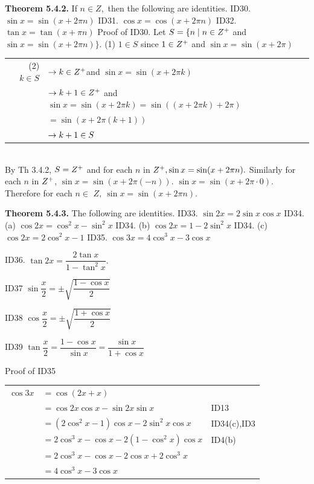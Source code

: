 
\textbf{Theorem 5.4.2.} If $n\in Z,$ then the following are identities.\nl
ID30. $\sin x = \sin(x + 2\pi n)$\nl
ID31. $\cos x = \cos(x + 2\pi n)$\nl
ID32. $\tan x = \tan(x + \pi n)$\nl
Proof of ID30. Let $S = \{n \mid n\in Z^{+}$ and $\sin x = \sin(x + 2\pi n) \}.$\nl
(1) $1\in S$ since $1\in Z^{+}$ and $\sin x = \sin(x +2\pi) $\nl
\begin{tabular}{r l l}
(2) $k\in S$& $\to k\in Z^{+} $and $\sin x = \sin(x + 2\pi k)$&\\
  & $\to k+1\in Z^{+} $ and $\sin x = \sin (x+2\pi k) = \sin((x+2\pi k)+2\pi)$&\\
  &\qquad \qquad$ = \sin(x+2\pi(k+1))$& \\
  & $\to k+1\in S $&\\
\end{tabular}\\
By Th 3.4.2, $S = Z^{+}$ and for each $n$ in $Z^{+},  \sin x = \sin(x+2\pi n).$   Similarly for each $n$ in $Z^{+}$, $\sin x = \sin(x+2\pi(-n)).$ $  \sin x = \sin(x +2\pi\cdot 0).$ Therefore for each $n \in$ $Z,~ \sin x = \sin(x +2\pi n).$ \nl

\textbf{Theorem 5.4.3.} The following are identities. \nl
ID33. $\sin 2x = 2 \sin x \cos x$\nl
ID34. (a) $\cos 2x = \cos^{2}x - \sin^{2}x$\nl
ID34. (b) $\cos 2x =1 -2\sin^{2}x$\nl
ID34. (c) $\cos 2x =2\cos^{2}x -1 $\nl
ID35. $\cos 3x = 4\cos^{3}x -3\cos x $\nl

ID36. $\tan 2x = \dfrac{2\tan x}{1 - \tan^{2}x}.$\nl

ID37 $\sin \dfrac{x}{2} = \pm\sqrt{\dfrac{1 - \cos x}{2}}$\nl

ID38 $\cos \dfrac{x}{2} = \pm\sqrt{\dfrac{1 + \cos x}{2}}$\nl

ID39  $\tan \dfrac{x}{2} = \dfrac{1 - \cos x}{\sin x} = \dfrac{\sin x}{1 + \cos x}$\nl

Proof of ID35\nl
\begin{tabular}{r l l}
$\cos 3x$&$= \cos(2x + x)$&\\
& $=\cos 2x\cos x - \sin 2x\sin x$ & ID13 \\
& $=(2\cos^{2}x -1)\cos x -2\sin^{2}x\cos x$& ID34(c),ID3\\
& $=2\cos^{3}x - \cos x-2(1 - \cos^{2}x)\cos x$& ID4(b) \\
& $=2\cos^{3}x - \cos x - 2\cos x + 2\cos^{3}x $&\\
& $=4\cos^{3}x - 3\cos x$&\\
\end{tabular}\\

